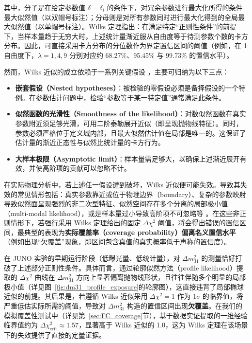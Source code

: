 其中，分子是在给定参数值 $\delta=\delta_i$ 的条件下，对冗余参数进行最大化所得的条件最大似然值（以双帽号标注）；分母则是对所有参数同时进行最大化得到的全局最大似然值（以单帽号标注）。Wilks 定理指出：在满足特定“正则性条件”的前提下，当样本量趋于无穷大时，上述统计量渐近服从自由度等于待测参数个数的卡方分布。因此，可直接采用卡方分布的分位数作为界定置信区间的阈值（例如，在 1 自由度下，$\lambda=1, 4, 9$ 分别对应约 68.27\%、95.45\% 与 99.73\% 的置信水平）\cite{Wilks:1938dza}。

然而，Wilks 近似的成立依赖于一系列关键假设 \cite{Wilks:1938dza, Fan:2000gm, Cranmer:2005hi, Cowan:2010js, ParticleDataGroup:2024cfk}，主要可归纳为以下三点：

\begin{itemize}[leftmargin=*,nosep]
  \item \textbf{嵌套假设（Nested hypotheses）}：被检验的零假设必须是备择假设的一个特例。在参数估计问题中，检验“参数等于某一特定值”通常满足此条件。
  \item \textbf{似然函数的光滑性（Smoothness of the likelihood）}：对数似然函数在真实参数附近须足够光滑，可用二阶泰勒展开近似（即呈现抛物线特征）。同时，参数必须严格位于定义域内部，且最大似然估计值在局部是唯一的。这保证了估计量的渐近正态性与似然比统计量的卡方行为。
  \item \textbf{大样本极限（Asymptotic limit）}：样本量需足够大，以确保上述渐近展开有效，并使高阶项的贡献可以忽略不计。
\end{itemize}

在实际物理分析中，若上述任一假设遭到破坏，Wilks 近似便可能失效。导致其失效的常见情形包括：真实参数靠近或位于物理边界（boundary）、复杂的参数映射导致似然面呈现强烈的非二次型特征、似然空间存在多个分离的局部极小值（multi-modal likelihood），或是样本量过小导致高阶项不可忽略等 \cite{Cowan:2010js, Cranmer:2005hi}。在这些非正则情形下，若强行采用 Wilks 定理给出的固定 $\Delta\chi^2$ 阈值，将会得出错误的置信区间，最典型的表现为\textbf{实际覆盖率（coverage probability）偏离名义置信水平}（例如出现“欠覆盖”现象，即区间包含真值的真实概率低于声称的置信度）。

在 JUNO 实验的早期运行阶段（低曝光量、低统计量），对 $\Delta m^2_{31}$ 的测量恰好打破了上述部分正则性条件。具体而言，通过轮廓似然方法（profile likelihood）提取的 $\Delta\chi^2$ 曲线在 $\Delta m^2_{31}$ 方向上显著偏离抛物线形状，且往往伴随多个明显的局部极小值（详见图~\ref{fig:dm31_profile_exposure}的轮廓图），这直接违背了局部椭球近似的前提。其后果是，若遵循 Wilks 近似采用 $\Delta\chi^2=1$ 作为 $1\sigma$ 的临界值，将严重低估实际所需的阈值，导致对 $\Delta m^2_{31}$ 构造的置信区间出现\textbf{欠覆盖}。在我们的模拟覆盖性测试中（详见第~\ref{sec:FC_coverage}节），基于数据实证提取的一维经验临界值约为 $\Delta\chi^2_{\mathrm{crit}}\approx1.57$，显著高于 Wilks 近似的 1.0，这为 Wilks 定理在该场景下的失效提供了直接的定量证据。

